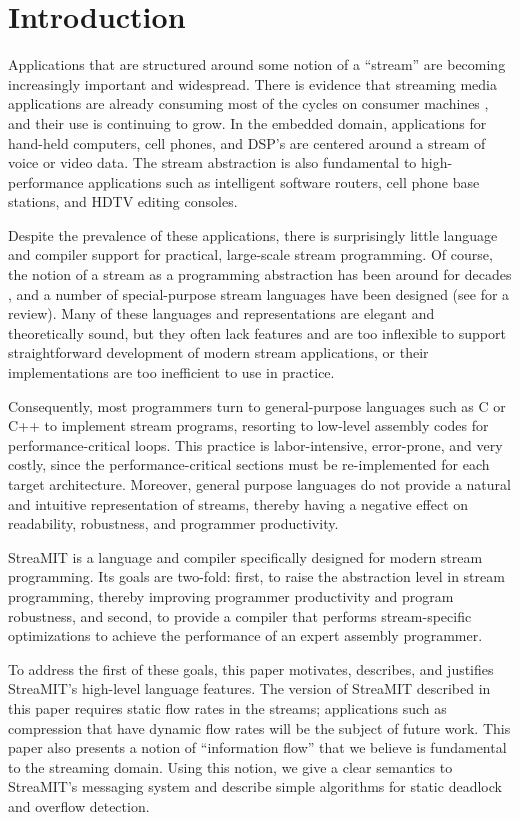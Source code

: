 \section{Introduction}

Applications that are structured around some notion of a ``stream''
are becoming increasingly important and widespread.  There is evidence
that streaming media applications are already consuming most of the
cycles on consumer machines \cite{Rix98}, and their use is continuing
to grow.  In the embedded domain, applications for hand-held
computers, cell phones, and DSP's are centered around a stream of
voice or video data.  The stream abstraction is also fundamental to
high-performance applications such as intelligent software routers,
cell phone base stations, and HDTV editing consoles.

Despite the prevalence of these applications, there is surprisingly
little language and compiler support for practical, large-scale stream
programming.  Of course, the notion of a stream as a programming
abstraction has been around for decades \cite{SICP}, and a number of
special-purpose stream languages have been designed (see
\cite{survey97} for a review).  Many of these languages and
representations are elegant and theoretically sound, but they often
lack features and are too inflexible to support straightforward
development of modern stream applications, or their implementations
are too inefficient to use in practice.

Consequently, most programmers turn to general-purpose languages such
as C or C++ to implement stream programs, resorting to low-level
assembly codes for performance-critical loops.  This practice is
labor-intensive, error-prone, and very costly, since the
performance-critical sections must be re-implemented for each target
architecture.  Moreover, general purpose languages do not provide a
natural and intuitive representation of streams, thereby having a
negative effect on readability, robustness, and programmer
productivity.

StreaMIT is a language and compiler specifically designed for modern
stream programming.  Its goals are two-fold: first, to raise the
abstraction level in stream programming, thereby improving programmer
productivity and program robustness, and second, to provide a compiler
that performs stream-specific optimizations to achieve the performance
of an expert assembly programmer.  

To address the first of these goals, this paper motivates, describes,
and justifies StreaMIT's high-level language features.  The version of
StreaMIT described in this paper requires static flow rates in the
streams; applications such as compression that have dynamic flow rates
will be the subject of future work.  This paper also presents a notion
of ``information flow'' that we believe is fundamental to the
streaming domain.  Using this notion, we give a clear semantics to
StreaMIT's messaging system and describe simple algorithms for static
deadlock and overflow detection.

